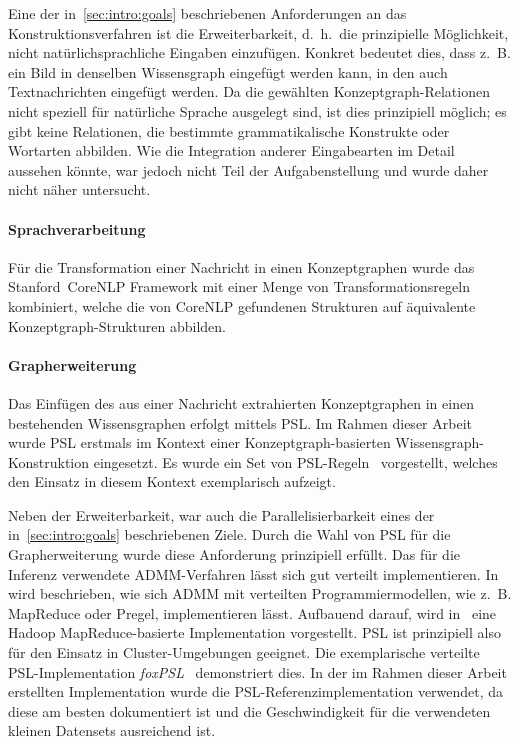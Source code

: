 Eine der in~\ref{sec:intro:goals} beschriebenen Anforderungen an das Konstruktionsverfahren ist die Erweiterbarkeit, d.~h.\ die prinzipielle Möglichkeit, nicht natürlichsprachliche Eingaben einzufügen.
Konkret bedeutet dies, dass z.~B. ein Bild in denselben Wissensgraph eingefügt werden kann, in den auch Textnachrichten eingefügt werden.
Da die gewählten Konzeptgraph-Relationen nicht speziell für natürliche Sprache ausgelegt sind, ist dies prinzipiell möglich;
es gibt keine Relationen, die bestimmte grammatikalische Konstrukte oder Wortarten abbilden.
Wie die Integration anderer Eingabearten im Detail aussehen könnte, war jedoch nicht Teil der Aufgabenstellung und wurde daher nicht näher untersucht.

\paragraph{Sprachverarbeitung}
Für die Transformation einer Nachricht in einen Konzeptgraphen wurde das Stanford~CoreNLP Framework mit einer Menge von Transformationsregeln~ kombiniert, welche die von CoreNLP gefundenen Strukturen auf äquivalente Konzeptgraph-Strukturen abbilden.

\paragraph{Grapherweiterung}
Das Einfügen des aus einer Nachricht extrahierten Konzeptgraphen in einen bestehenden Wissensgraphen erfolgt mittels PSL.\@
Im Rahmen dieser Arbeit wurde PSL erstmals im Kontext einer Konzeptgraph-basierten Wissensgraph-Konstruktion eingesetzt.
Es wurde ein Set von PSL-Regeln~ vorgestellt, welches den Einsatz in diesem Kontext exemplarisch aufzeigt.

Neben der Erweiterbarkeit, war auch die Parallelisierbarkeit eines der in~\ref{sec:intro:goals} beschriebenen Ziele.
Durch die Wahl von PSL für die Grapherweiterung wurde diese Anforderung prinzipiell erfüllt.
Das für die Inferenz verwendete ADMM-Verfahren lässt sich gut verteilt implementieren.
In~\cite[Kapitel 10]{Boyd2011} wird beschrieben, wie sich ADMM mit verteilten Programmiermodellen, wie z.~B. MapReduce oder Pregel, implementieren lässt.
Aufbauend darauf, wird in~\cite{Lubell-Doughtie2013} eine Hadoop MapReduce-basierte Implementation vorgestellt.
PSL ist prinzipiell also für den Einsatz in Cluster-Umgebungen geeignet.
Die exemplarische verteilte PSL-Implementation \textit{foxPSL}~\cite{Magliacane2015} demonstriert dies.
In der im Rahmen dieser Arbeit erstellten Implementation wurde die PSL-Referenzimplementation verwendet, da diese am besten dokumentiert ist und die Geschwindigkeit für die verwendeten kleinen Datensets ausreichend ist.

